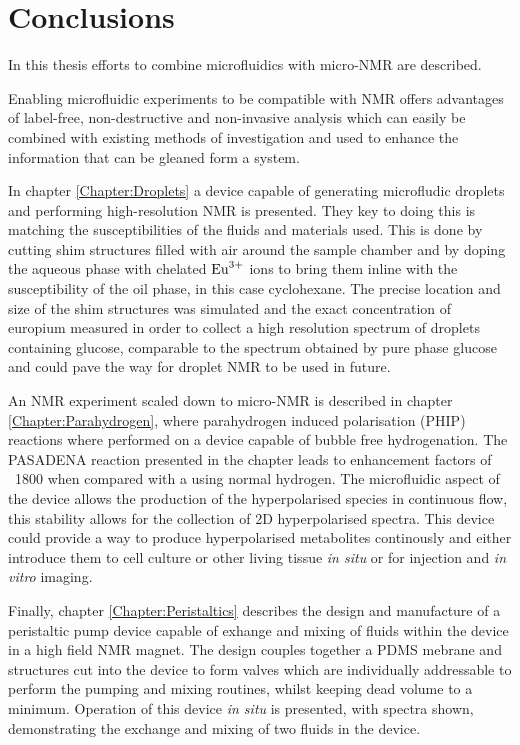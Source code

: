 \chapter{Conclusions} \label{Chapter:Conclusions}

In this thesis efforts to combine microfluidics with micro-NMR are described.

Enabling microfluidic experiments to be compatible with NMR offers advantages
of label-free, non-destructive and non-invasive analysis which can easily
be combined with existing methods of investigation and used to
enhance the information that can be gleaned form a system.

In chapter \ref{Chapter:Droplets} a device capable of generating microfludic
droplets and performing high-resolution NMR is presented. They key to doing this
is matching the susceptibilities of the fluids and materials used. This is done
by cutting shim structures filled with air around the sample chamber and by
doping the aqueous phase with chelated $\ce{Eu^3+}$ ions to bring them inline
with the susceptibility of the oil phase, in this case cyclohexane. The
precise location and size of the shim structures was simulated and the
exact concentration of europium measured in order to collect a high
resolution spectrum of droplets containing glucose, comparable to the spectrum
obtained by pure phase glucose and could pave the way for droplet NMR to be used
in future.

An NMR experiment scaled down to micro-NMR is described in chapter \ref{Chapter:Parahydrogen},
where parahydrogen induced polarisation (PHIP) reactions where performed on a device
capable of bubble free hydrogenation. The PASADENA reaction presented in the chapter
leads to enhancement factors of ~1800 when compared with a using normal hydrogen. The microfluidic
aspect of the device allows the production of the hyperpolarised species in continuous flow, this
stability allows for the collection of 2D hyperpolarised spectra. This device could provide a
way to produce hyperpolarised metabolites continously and either introduce them to  cell culture
or other living tissue \textit{in situ} or for injection and \textit{in vitro} imaging.

Finally, chapter \ref{Chapter:Peristaltics} describes the design and manufacture of a
peristaltic pump device capable of exhange and mixing of fluids within the device in
a high field NMR magnet. The design couples together a PDMS mebrane and structures cut into
the device to form valves which are individually addressable to perform the pumping and mixing
routines, whilst keeping dead volume to a minimum. Operation of this device \textit{in situ} is presented,
with spectra shown, demonstrating the exchange and mixing of two fluids in the device.


